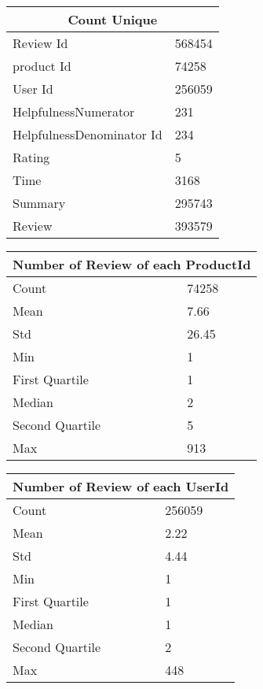 \documentclass[12pt]{article}
\begin{document}
\begin{center}
  \begin{tabular}{| l | l |}
    \hline
    \multicolumn{2}{|c|}{\textbf{Count Unique}}\\ 
    \hline
    Review Id & 568454 \\ \hline
    product Id & 74258 \\ \hline
    User Id & 256059 \\ \hline
    HelpfulnessNumerator & 231 \\ \hline
    HelpfulnessDenominator Id & 234 \\ \hline
    Rating & 5 \\ \hline
    Time & 3168 \\ \hline
    Summary & 295743 \\ \hline
    Review & 393579 \\ \hline
  \end{tabular}
\end{center}

\begin{center}
  \begin{tabular}{| l | l |}
    \hline
    \multicolumn{2}{|c|}{\textbf{Number of Review of each ProductId}}\\
    \hline
    Count & 74258 \\ \hline
    Mean & 7.66 \\ \hline
    Std & 26.45 \\ \hline
    Min & 1 \\ \hline
    First Quartile & 1 \\ \hline
    Median & 2 \\ \hline
    Second Quartile & 5 \\ \hline
    Max & 913 \\ \hline
  \end{tabular}
\end{center}

\begin{center}
  \begin{tabular}{| l | l |}
    \hline
    \multicolumn{2}{|c|}{\textbf{Number of Review of each UserId}}\\
    \hline
    Count & 256059 \\ \hline
    Mean & 2.22 \\ \hline
    Std & 4.44 \\ \hline
    Min & 1 \\ \hline
    First Quartile & 1 \\ \hline
    Median & 1 \\ \hline
    Second Quartile & 2 \\ \hline
    Max & 448 \\ \hline
  \end{tabular}
\end{center}
\end{document}
